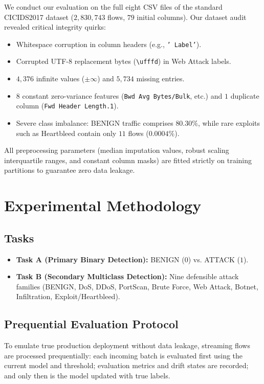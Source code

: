 \documentclass[conference]{IEEEtran}
\begin{document}
We conduct our evaluation on the full eight CSV files of the standard CICIDS2017 dataset ($2,830,743$ flows, $79$ initial columns).
Our dataset audit revealed critical integrity quirks:
\begin{itemize}
    \item Whitespace corruption in column headers (e.g., \texttt{' Label'}).
    \item Corrupted UTF-8 replacement bytes (\texttt{\textbackslash ufffd}) in Web Attack labels.
    \item $4,376$ infinite values ($\pm\infty$) and $5,734$ missing entries.
    \item $8$ constant zero-variance features (\texttt{Bwd Avg Bytes/Bulk}, etc.) and $1$ duplicate column (\texttt{Fwd Header Length.1}).
    \item Severe class imbalance: BENIGN traffic comprises $80.30\%$, while rare exploits such as Heartbleed contain only $11$ flows ($0.0004\%$).
\end{itemize}
All preprocessing parameters (median imputation values, robust scaling interquartile ranges, and constant column masks) are fitted strictly on training partitions to guarantee zero data leakage.

\section{Experimental Methodology}
\subsection{Tasks}
\begin{itemize}
    \item \textbf{Task A (Primary Binary Detection):} BENIGN ($0$) vs. ATTACK ($1$).
    \item \textbf{Task B (Secondary Multiclass Detection):} Nine defensible attack families (BENIGN, DoS, DDoS, PortScan, Brute Force, Web Attack, Botnet, Infiltration, Exploit/Heartbleed).
\end{itemize}

\subsection{Prequential Evaluation Protocol}
To emulate true production deployment without data leakage, streaming flows are processed prequentially: each incoming batch is evaluated first using the current model and threshold; evaluation metrics and drift states are recorded; and only then is the model updated with true labels.
\end{document}

